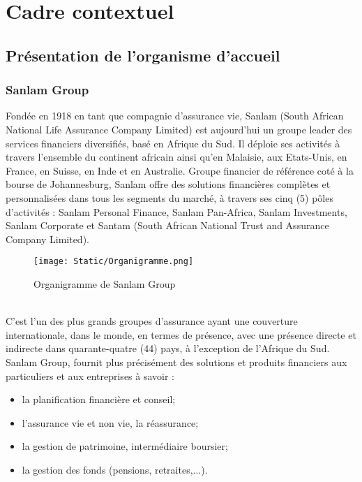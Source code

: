 \section{Cadre contextuel}

\subsection{Pr\'esentation de l'organisme d'accueil}
\subsubsection{\textbf{Sanlam Group}}
Fondée en 1918 en tant que compagnie d’assurance vie, Sanlam (South African National Life Assurance Company Limited) est aujourd’hui un groupe leader des services financiers diversifiés, basé en Afrique du Sud. Il déploie ses activités à travers l’ensemble du continent africain ainsi qu’en Malaisie, aux Etats-Unis, en France, en Suisse, en Inde et en Australie. Groupe financier de référence coté à la bourse de Johannesburg, Sanlam offre des solutions financières complètes et personnalisées dans tous les segments du marché, à travers ses cinq (5) pôles d’activités : Sanlam Personal Finance, Sanlam Pan-Africa, Sanlam Investments, Sanlam Corporate et Santam (South African National Trust and Assurance Company Limited).
\begin{figure}[!h]
  \caption{Organigramme de Sanlam Group}  \label{fig:xray}
  \begin{center}
  \hspace*{-1.0in}
  \texttt{[image: Static/Organigramme.png]} 
  \end{center}
\end{figure}
\\

C'est l'un des plus grands groupes d'assurance ayant une couverture internationale, dans le monde, en termes de présence, avec une présence directe et indirecte dans quarante-quatre (44) pays, à l'exception de l'Afrique du Sud. Sanlam Group, fournit plus précisément des solutions et produits financiers aux particuliers et aux entreprises \`a savoir :
\begin{itemize}[parsep=0cm,itemsep=0cm]
\item la planification financière et conseil;
\item l'assurance vie et non vie, la r\'eassurance;
\item la gestion de patrimoine, interm\'ediaire boursier;
\item la gestion des fonds (pensions, retraites,...).
\end{itemize}

